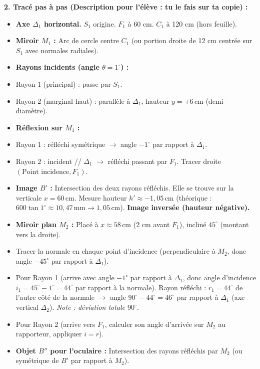 \documentclass[11pt]{article}
\begin{document}
\begin{exoresolu}
\textbf{2. Tracé pas à pas (Description pour l'élève : tu le fais sur ta copie) :}
\begin{itemize}
    \item \textbf{Axe $\Delta_1$ horizontal.} $S_1$ origine. $F_1$ à 60 cm. $C_1$ à 120 cm (hors feuille).
    \item \textbf{Miroir $M_1$ :} Arc de cercle centre $C_1$ (ou portion droite de 12 cm centrée sur $S_1$ avec normales radiales).
    \item \textbf{Rayons incidents (angle $\theta=1^\circ$) :}
        \item Rayon 1 (principal) : passe par $S_1$.
        \item Rayon 2 (marginal haut) : parallèle à $\Delta_1$, hauteur $y = +6\,\text{cm}$ (demi-diamètre).
    \item \textbf{Réflexion sur $M_1$ :}
        \item Rayon 1 : réfléchi symétrique $\to$ angle $-1^\circ$ par rapport à $\Delta_1$.
        \item Rayon 2 : incident // $\Delta_1$ $\to$ réfléchi passant par $F_1$. Tracer droite $( \text{Point incidence}, F_1)$.
    \item \textbf{Image $B'$ :} Intersection des deux rayons réfléchis. Elle se trouve sur la verticale $x=60\,\text{cm}$. Mesure hauteur $h' \approx -1,05\,\text{cm}$ (théorique : $600 \tan 1^\circ \approx 10,47\,\text{mm} \to 1,05\,\text{cm}$). \textbf{Image inversée (hauteur négative).}
    \item \textbf{Miroir plan $M_2$ :} Placé à $x \approx 58\,\text{cm}$ (2 cm avant $F_1$), incliné $45^\circ$ (montant vers la droite).
        \item Tracer la normale en chaque point d'incidence (perpendiculaire à $M_2$, donc angle $-45^\circ$ par rapport à $\Delta_1$).
        \item Pour Rayon 1 (arrive avec angle $-1^\circ$ par rapport à $\Delta_1$, donc angle d'incidence $i_1 = 45^\circ - 1^\circ = 44^\circ$ par rapport à la normale). Rayon réfléchi : $r_1 = 44^\circ$ de l'autre côté de la normale $\to$ angle $90^\circ - 44^\circ = 46^\circ$ par rapport à $\Delta_1$ (axe vertical $\Delta_2$). \textit{Note : déviation totale $90^\circ$}.
        \item Pour Rayon 2 (arrive vers $F_1$, calculer son angle d'arrivée sur $M_2$ au rapporteur, appliquer $i=r$).
    \item \textbf{Objet $B''$ pour l'oculaire :} Intersection des rayons réfléchis par $M_2$ (ou symétrique de $B'$ par rapport à $M_2$).

\end{itemize}
\end{exoresolu}
\end{document}
